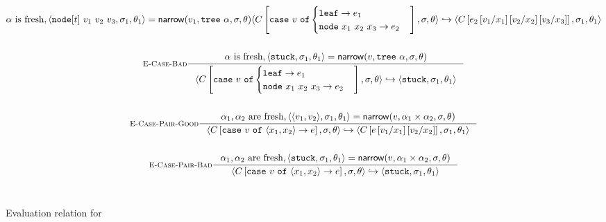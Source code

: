 \begin{figure*}
\begin{gather*}
  {\thole \mbox{ is fresh}, \triple{\vnode{t}{v_1}{v_2}{v_3}}{\vsu_1}{\tsu_1} = \force{v_1}{\ttree{\thole}}{\vsu}{\tsu}
  }
  {\step{\inctx{\ecase{v}{e_1}{x_1}{x_2}{x_3}{e_2}}}{\vsu}{\tsu}
        {\inctx{e_2\sub{x_1}{v_1}\sub{x_2}{v_2}\sub{x_3}{v_3}}}{\vsu_1}{\tsu_1}}
\\ \\
\inference[\recasebad]
  {\thole \mbox{ is fresh}, \triple{\stuck}{\vsu_1}{\tsu_1} = \force{v}{\ttree{\thole}}{\vsu}{\tsu}
  }
  {\step{\inctx{\ecase{v}{e_1}{x_1}{x_2}{x_3}{e_2}}}{\vsu}{\tsu}
        {\stuck}{\vsu_1}{\tsu_1}}
\\ \\
\inference[\repcasegood]
  {\thole_1, \thole_2 \mbox{ are fresh}, \triple{\epair{v_1}{v_2}}{\vsu_1}{\tsu_1} = \force{v}{\tprod{\thole_1}{\thole_2}}{\vsu}{\tsu}
  }
  {\step{\inctx{\epcase{v}{x_1}{x_2}{e}}}{\vsu}{\tsu}
        {\inctx{e\sub{x_1}{v_1}\sub{x_2}{v_2}}}{\vsu_1}{\tsu_1}}
\\ \\
\inference[\repcasebad]
  {\thole_1, \thole_2 \mbox{ are fresh}, \triple{\stuck}{\vsu_1}{\tsu_1} = \force{v}{\tprod{\thole_1}{\thole_2}}{\vsu}{\tsu}
  }
  {\step{\inctx{\epcase{v}{x_1}{x_2}{e}}}{\vsu}{\tsu}
        {\stuck}{\vsu_1}{\tsu_1}}
\end{gather*}
\\ %
\caption{Evaluation relation for \lang}
\label{fig:operational}
\end{figure*}
